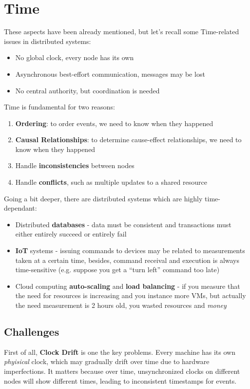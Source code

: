 \chapter{Time}

These aspects have been already mentioned, but let's recall some Time-related issues in distributed systems:
\begin{itemize}
   \item No global clock, every node has its own
   \item Asynchronous best-effort communication, messages may be lost
   \item No central authority, but coordination is needed
\end{itemize}

Time is fundamental for two reasons:
\begin{enumerate}
   \item \textbf{Ordering}: to order events, we need to know when they happened
   \item \textbf{Causal Relationships}: to determine cause-effect relationships, we need to know when they happened
   \item Handle \textbf{inconsistencies} between nodes
   \item Handle \textbf{conflicts}, such as multiple updates to a shared resource
\end{enumerate}

Going a bit deeper, there are distributed systems which are highly time-dependant:
\begin{itemize}
   \item Distributed \textbf{databases} - data must be consistent and transactions must either entirely succeed or entirely fail
   \item \textbf{IoT} systems - issuing commands to devices may be related to measurements taken at a certain time, besides, command receival and execution is always time-sensitive (e.g. suppose you get a ``turn left'' command too late)
   \item Cloud computing \textbf{auto-scaling} and \textbf{load balancing} - if you measure that the need for resources is increasing and you instance more VMs, but actually the need measurement is 2 hours old, you wasted resources and \textit{money}
\end{itemize}


\section{Challenges}
First of all, \textbf{Clock Drift} is one the key problems.
Every machine has its own \textit{phyisical} clock, which may gradually drift over time due to hardware imperfections.
It matters because over time, unsynchronized clocks on different nodes will show different times, leading to inconsistent timestamps for events.

